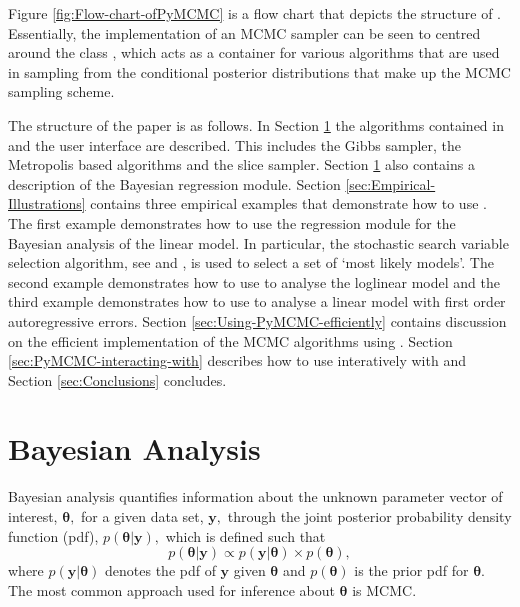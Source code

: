 \documentclass[article]{jss}
\begin{document}
Figure \ref{fig:Flow-chart-ofPyMCMC} is a flow chart that depicts
the structure of . Essentially, the implementation of an MCMC
sampler can be seen to centred around the class , which
acts as a container for various algorithms that are used in sampling
from the conditional posterior distributions that make up the MCMC
sampling scheme. 

The structure of the paper is as follows. In Section \ref{sec:Bayesian-Analysis}
the algorithms contained in  and the user interface are described.
This includes the Gibbs sampler, the Metropolis based algorithms and
the slice sampler. Section \ref{sec:Bayesian-Analysis} also contains
a description of the Bayesian regression module. Section \ref{sec:Empirical-Illustrations}
contains three empirical examples that demonstrate how to use .
The first example demonstrates how to use the regression module for
the Bayesian analysis of the linear model. In particular, the stochastic
search variable selection algorithm, see \citet{GeorgeMcCulloch1993}
and \citet{MarinRobert2007}, is used to select a set of `most likely
models'. The second example demonstrates how to use  to analyse
the loglinear model and the third example demonstrates how to use
 to analyse a linear model with first order autoregressive errors.
Section \ref{sec:Using-PyMCMC-efficiently} contains discussion on
the efficient implementation of the MCMC algorithms using .
Section \ref{sec:PyMCMC-interacting-with} describes how to use 
interatively with  and Section \ref{sec:Conclusions} concludes.


\section{Bayesian Analysis}
\label{sec:Bayesian-Analysis}

Bayesian analysis quantifies information about the unknown parameter
vector of interest, $\bm{\theta},$ for a given data set, $\bm{y},$
through the joint posterior probability density function (pdf),
$p(\bm{\theta}|\bm{y}),$ which is defined such that \begin{equation}
  p(\bm{\theta}|\bm{y})\propto p(\bm{y}|\bm{\theta})\times
  p(\bm{\theta}),\label{eq:joint post}\end{equation} where
$p(\bm{y}|\bm{\theta})$ denotes the pdf of $\bm{y}$ given
$\bm{\theta}$ and $p(\bm{\theta})$ is the prior pdf for $\bm{\theta}.$
The most common approach used for inference about $\bm{\theta}$ is
MCMC.
\end{document}
